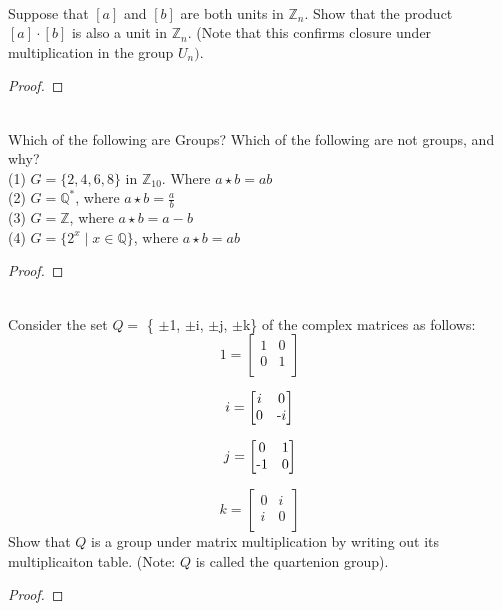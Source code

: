 \documentclass[12pt]{article}
\newcommand{\Z}{\mathbb{Z}}
\newcommand{\Q}{\mathbb{Q}}
\newenvironment{problem}[2][Problem]{\begin{trivlist}
\item[\hskip \labelsep {\bfseries #1}\hskip \labelsep {\bfseries #2.}]}{\end{trivlist}}
\begin{document}
\begin{problem}{5}
\text{ }\\
Suppose that $[a]$ and $[b]$ are both units in $\Z_{n}$.  Show that the product $[a] \cdot [b]$ is also a unit in $\Z_{n}.$ (Note that this confirms closure under multiplication in the group $U_{n})$.
\end{problem}
 
\begin{proof}

\end{proof}

\begin{problem}{6}
\text{ }\\
Which of the following are Groups? Which of the following are not groups, and why?\\

\indent (1)  $G = \{{2, 4, 6, 8}\}$ in $\Z_{10}$.  Where $a \star b = ab$\\
\indent (2)  $G = \Q^{\ast}$, where $a \star b = \frac{a}{b}$\\
\indent (3) $G = \Z$, where $a \star b = a - b$\\
\indent (4) $G = \{ {2^{x}\mid x \in \Q} \}$, where $a \star b = ab$\\
 
\end{problem}
 
\begin{proof}

\end{proof}

\begin{problem}{7}
\text{ }\\
Consider the set $Q =$ \{ $\pm$1, $\pm$i, $\pm$j, $\pm$k\} of the complex matrices as follows:\\
\[
1=
  \begin{bmatrix}
    1 & 0\\
    0 & 1\\
  \end{bmatrix}
\]

\[
i=
  \begin{bmatrix}
    i & 0\\
    0 & $-$i\\
  \end{bmatrix}
\]

\[
j=
  \begin{bmatrix}
    0 & 1\\
    $-$1 & 0\\
  \end{bmatrix}
\]

\[
k=
  \begin{bmatrix}
    0 & i\\
    i & 0\\
  \end{bmatrix}
\]
Show that $Q$ is a group under matrix multiplication by writing out its multiplicaiton table. (Note: $Q$ is called the quartenion group).
\end{problem}
\begin{proof}

\end{proof}
\end{document}
